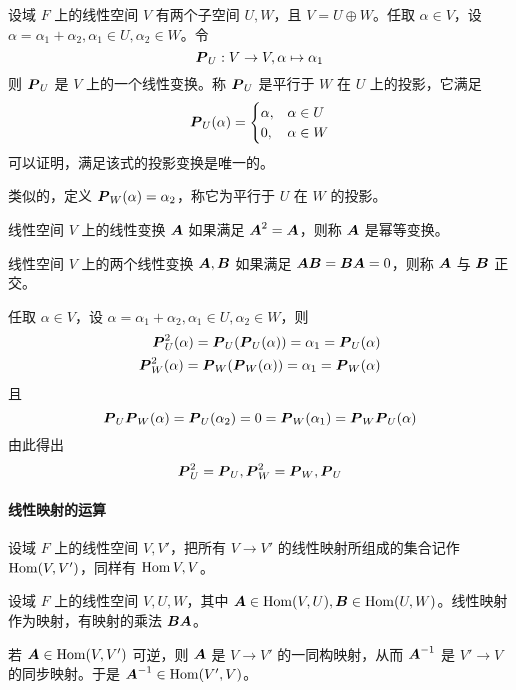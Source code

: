 设域 $F$ 上的线性空间 $V$ 有两个子空间 $U,W$，且 $V = U \oplus W$。任取 $\alpha \in V$，设 $\alpha = \alpha_1 + \alpha_2, \alpha_1 \in U, \alpha_2\in W$。令
\[ \boldsymbol{P}_U : V \to V, \alpha \mapsto \alpha_1 \]
则 $\boldsymbol{P}_U$ 是 $V$ 上的一个线性变换。称 $\boldsymbol{P}_U$ 是平行于 $W$ 在 $U$ 上的投影，它满足
\[ \boldsymbol{P}_U(\alpha) =
    \begin{cases}
        \alpha, & \alpha \in U  \\
        0 ,     & \alpha \in W
    \end{cases} \]
可以证明，满足该式的投影变换是唯一的。

类似的，定义 $\boldsymbol{P}_W(\alpha) = \alpha_2$，称它为平行于 $U$ 在 $W$ 的投影。

\begin{definition}[幂等变换]
    线性空间 $V$ 上的线性变换 $\boldsymbol{A}$ 如果满足 $\boldsymbol{A}^2 = \boldsymbol{A}$，则称 $\boldsymbol{A}$ 是幂等变换。
\end{definition}

\begin{definition}
    线性空间 $V$ 上的两个线性变换 $\boldsymbol{A}, \boldsymbol{B}$ 如果满足 $\boldsymbol{A}\boldsymbol{B} = \boldsymbol{B}\boldsymbol{A} = 0$，则称 $\boldsymbol{A}$ 与 $\boldsymbol{B}$ 正交。
\end{definition}

任取 $\alpha\in V$，设 $\alpha = \alpha_1 + \alpha_2, \alpha_1 \in U, \alpha_2 \in W$，则
\begin{equation*}
    \begin{aligned}
        \boldsymbol{P}_U^2(\alpha) = \boldsymbol{P}_U(\boldsymbol{P}_U(\alpha)) = \alpha_1 = \boldsymbol{P}_U(\alpha) \\
        \boldsymbol{P}_W^2(\alpha) = \boldsymbol{P}_W(\boldsymbol{P}_W(\alpha)) = \alpha_1 = \boldsymbol{P}_W(\alpha)
    \end{aligned}
\end{equation*}
且
\[ \boldsymbol{P}_U\boldsymbol{P}_W(\alpha) = \boldsymbol{P}_U(\alpha_2) = 0 = \boldsymbol{P}_W(\alpha_1) = \boldsymbol{P}_W\boldsymbol{P}_U(\alpha) \]
由此得出
\[ \boldsymbol{P}_U^2 = \boldsymbol{P}_U, \boldsymbol{P}_W^2 = \boldsymbol{P}_W, \boldsymbol{P}_U \]

\paragraph{线性映射的运算}

设域 $F$ 上的线性空间 $V,V'$，把所有 $V \to V'$ 的线性映射所组成的集合记作 $\operatorname{Hom}(V,V')$，同样有 $\operatorname{Hom}{V,V}$。

设域 $F$ 上的线性空间 $V,U,W$，其中 $\boldsymbol{A} \in \operatorname{Hom}(V,U), \boldsymbol{B} \in \operatorname{Hom}(U,W)$。线性映射作为映射，有映射的乘法 $\boldsymbol{B}\boldsymbol{A}$。

若 $\boldsymbol{A}\in \operatorname{Hom}(V,V')$ 可逆，则 $\boldsymbol{A}$ 是 $V \to V'$ 的一同构映射，从而 $\boldsymbol{A}^{-1}$ 是 $V' \to V$ 的同步映射。于是 $\boldsymbol{A}^{-1} \in \operatorname{Hom}(V',V)$。

